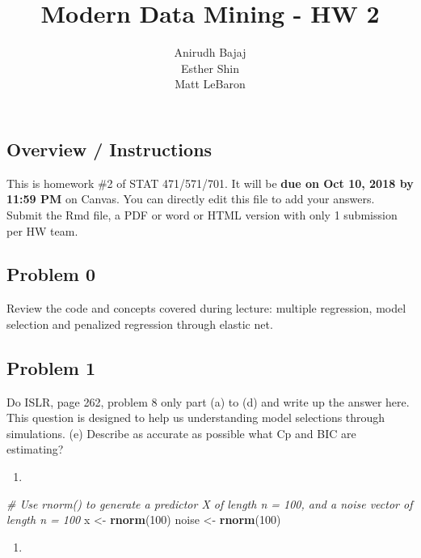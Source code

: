 \documentclass[]{article}
\title{Modern Data Mining - HW 2}
\author{Anirudh Bajaj \\ Esther Shin \\ Matt LeBaron}
\date{}
\newenvironment{Shaded}{\begin{snugshade}}{\end{snugshade}}
\newcommand{\KeywordTok}[1]{\textcolor[rgb]{0.13,0.29,0.53}{\textbf{#1}}}
\newcommand{\DecValTok}[1]{\textcolor[rgb]{0.00,0.00,0.81}{#1}}
\newcommand{\StringTok}[1]{\textcolor[rgb]{0.31,0.60,0.02}{#1}}
\newcommand{\CommentTok}[1]{\textcolor[rgb]{0.56,0.35,0.01}{\textit{#1}}}
\newcommand{\NormalTok}[1]{#1}
\begin{document}
\maketitle

\subsection{Overview / Instructions}\label{overview-instructions}

This is homework \#2 of STAT 471/571/701. It will be \textbf{due on Oct
10, 2018 by 11:59 PM} on Canvas. You can directly edit this file to add
your answers. Submit the Rmd file, a PDF or word or HTML version with
only 1 submission per HW team.

\subsection{Problem 0}\label{problem-0}

Review the code and concepts covered during lecture: multiple
regression, model selection and penalized regression through elastic
net.

\subsection{Problem 1}\label{problem-1}

Do ISLR, page 262, problem 8 only part (a) to (d) and write up the
answer here. This question is designed to help us understanding model
selections through simulations. (e) Describe as accurate as possible
what Cp and BIC are estimating?

\begin{enumerate}
\def\labelenumi{(\alph{enumi})}
\item
\end{enumerate}

\begin{Shaded}
\begin{Highlighting}[]
\CommentTok{# Use rnorm() to generate a predictor X of length n = 100, and a noise vector of length n = 100}
\NormalTok{x <-}\StringTok{ }\KeywordTok{rnorm}\NormalTok{(}\DecValTok{100}\NormalTok{)}
\NormalTok{noise <-}\StringTok{ }\KeywordTok{rnorm}\NormalTok{(}\DecValTok{100}\NormalTok{)}
\end{Highlighting}
\end{Shaded}

\begin{enumerate}
\def\labelenumi{(\alph{enumi})}
\setcounter{enumi}{1}
\item
\end{enumerate}
\end{document}
